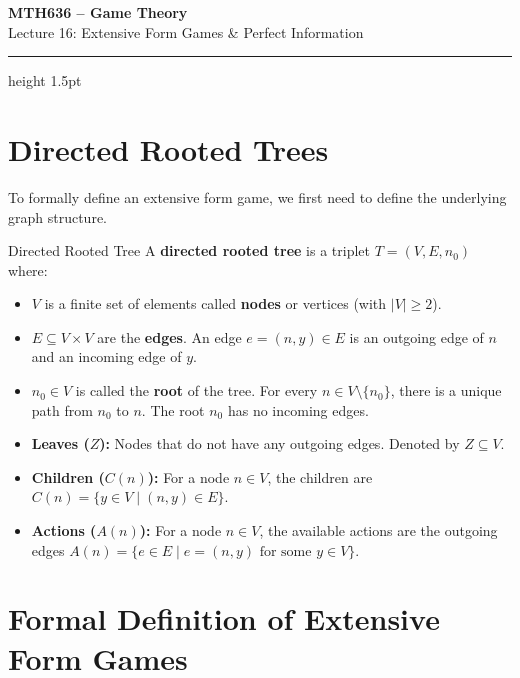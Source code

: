 \documentclass[12pt, a4paper]{article}
\begin{document}
\begin{center}
  {\LARGE\bfseries\sffamily\color{defblue} MTH636 -- Game Theory}\\[6pt]
  {\Large\sffamily Lecture 16: Extensive Form Games \& Perfect Information}\\[4pt]
\end{center}
\vspace{0.5cm}
\hrule height 1.5pt
\vspace{0.3cm}

\section{Directed Rooted Trees}

To formally define an extensive form game, we first need to define the underlying graph structure.

\begin{defbox}{Directed Rooted Tree}
  A \textbf{directed rooted tree} is a triplet $T = (V, E, n_0)$ where:
  \begin{itemize}
      \item $V$ is a finite set of elements called \textbf{nodes} or vertices (with $|V| \geq 2$).
      \item $E \subseteq V \times V$ are the \textbf{edges}. An edge $e = (n,y) \in E$ is an outgoing edge of $n$ and an incoming edge of $y$.
      \item $n_0 \in V$ is called the \textbf{root} of the tree. For every $n \in V \setminus \{n_0\}$, there is a unique path from $n_0$ to $n$. The root $n_0$ has no incoming edges.
  \end{itemize}
\end{defbox}

\begin{itemize}
    \item \textbf{Leaves ($Z$):} Nodes that do not have any outgoing edges. Denoted by $Z \subseteq V$.
    \item \textbf{Children ($C(n)$):} For a node $n \in V$, the children are $C(n) = \{y \in V \mid (n,y) \in E\}$.
    \item \textbf{Actions ($A(n)$):} For a node $n \in V$, the available actions are the outgoing edges $A(n) = \{e \in E \mid e = (n,y) \text{ for some } y \in V\}$.
\end{itemize}

\section{Formal Definition of Extensive Form Games}
\end{document}
